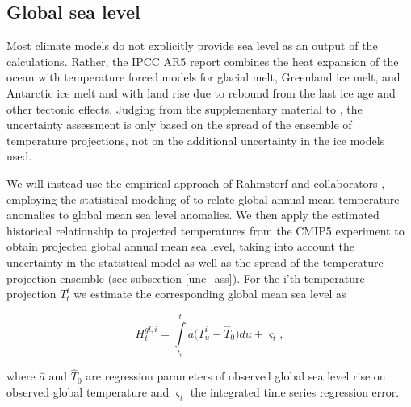 \documentclass[draft,linenumbers]{agujournal}
\begin{document}
\subsection{Global sea level}
Most climate models do not explicitly provide sea level as an output of the calculations. Rather, the IPCC AR5 report \citep[ch.~13]{ipcc} combines the heat expansion of the ocean with temperature forced models for glacial melt, Greenland ice melt, and Antarctic ice melt and with land rise due to rebound from the last ice age and other tectonic effects. Judging from the supplementary material to \citet[ch.~13]{ipcc}, the uncertainty assessment is only based on the spread of the ensemble of temperature projections, not on the additional uncertainty in the ice models used.

We will instead use the empirical approach of Rahmstorf and collaborators \citep{Rahmstorf07,Rahmstorf11}, employing the statistical modeling of \citet{Bolin2014a} to relate global annual mean temperature anomalies to global mean sea level anomalies. 
We then apply the estimated historical relationship to projected temperatures from the CMIP5 experiment \citep{cmip5} to obtain projected global annual mean sea level, taking into account the uncertainty in the statistical model as well as the spread of the temperature projection ensemble (see subsection \ref{unc_ass}). 
For the i'th temperature projection $T_t^i$ we estimate the corresponding global mean sea level as
\begin{linenomath*}
\[H_t^{gl,i} = \int\limits_{{t_0}}^t {{\hat a} (T_u^i - {{\hat T}_0}} )du + {\varsigma _t},\]
\end{linenomath*}
where ${\hat a}$ and ${\hat T}_0$ are regression parameters of observed global sea level  rise on observed global temperature and $\varsigma_t$ the integrated time series regression error.
\end{document}
